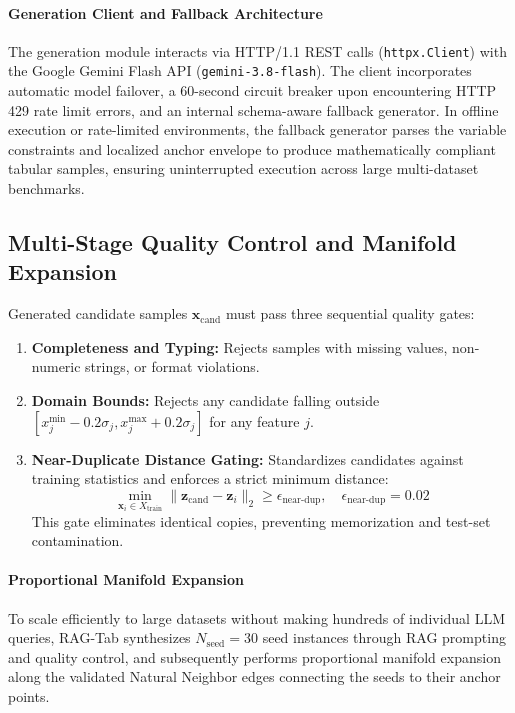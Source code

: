 \documentclass[sn-basic]{sn-jnl}
\begin{document}
\paragraph{Generation Client and Fallback Architecture}
The generation module interacts via HTTP/1.1 REST calls (\texttt{httpx.Client}) with the Google Gemini Flash API (\texttt{gemini-3.8-flash}). The client incorporates automatic model failover, a 60-second circuit breaker upon encountering HTTP 429 rate limit errors, and an internal schema-aware fallback generator. In offline execution or rate-limited environments, the fallback generator parses the variable constraints and localized anchor envelope to produce mathematically compliant tabular samples, ensuring uninterrupted execution across large multi-dataset benchmarks.

\subsection{Multi-Stage Quality Control and Manifold Expansion}
\label{subsec:quality_control}
Generated candidate samples $\mathbf{x}_{\text{cand}}$ must pass three sequential quality gates:
\begin{enumerate}
    \item \textbf{Completeness and Typing:} Rejects samples with missing values, non-numeric strings, or format violations.
    \item \textbf{Domain Bounds:} Rejects any candidate falling outside $[x_j^{\min} - 0.2\sigma_j, x_j^{\max} + 0.2\sigma_j]$ for any feature $j$.
    \item \textbf{Near-Duplicate Distance Gating:} Standardizes candidates against training statistics and enforces a strict minimum distance:
    \begin{equation}
    \label{eq:near_duplicate}
    \min_{\mathbf{x}_i \in X_{\text{train}}} \|\mathbf{z}_{\text{cand}} - \mathbf{z}_i\|_2 \ge \epsilon_{\text{near-dup}}, \quad \epsilon_{\text{near-dup}} = 0.02
    \end{equation}
    This gate eliminates identical copies, preventing memorization and test-set contamination.
\end{enumerate}

\paragraph{Proportional Manifold Expansion}
To scale efficiently to large datasets without making hundreds of individual LLM queries, RAG-Tab synthesizes $N_{\text{seed}} = 30$ seed instances through RAG prompting and quality control, and subsequently performs proportional manifold expansion along the validated Natural Neighbor edges connecting the seeds to their anchor points.
\end{document}

